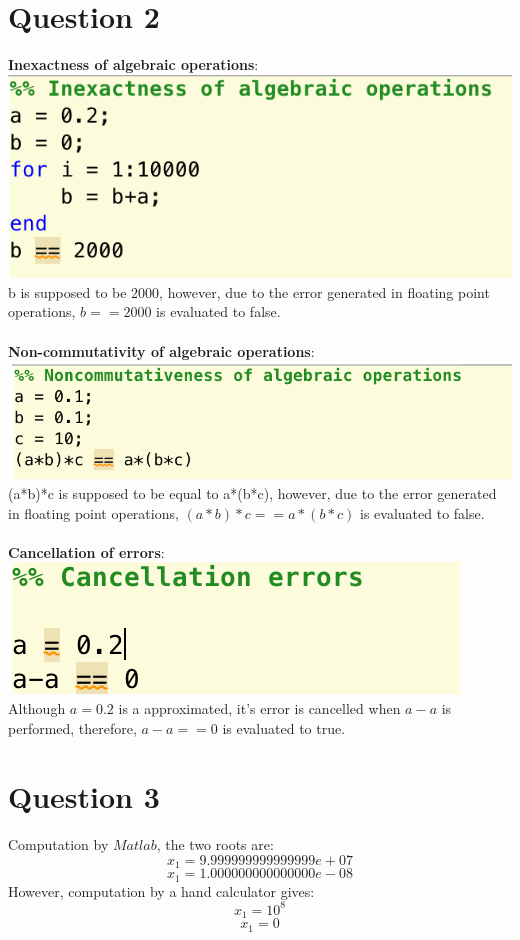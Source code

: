 \documentclass[11pt]{article} %
\begin{document}
\section{Question 2}
\textbf{Inexactness of algebraic operations}:\\
\includegraphics{q21}\\
b is supposed to be 2000, however, due to the error generated in floating point operations, $b==2000$ is evaluated to false. \\\\
\textbf{Non-commutativity of algebraic operations}:\\
\includegraphics{q22}\\
(a*b)*c is supposed to be equal to a*(b*c), however, due to the error generated in floating point operations, $(a*b)*c == a*(b*c)$ is evaluated to false. \\\\
\textbf{Cancellation of errors}:\\
\includegraphics{q23}\\
Although $a = 0.2$ is a approximated, it's error is cancelled when $a-a$ is performed, therefore, $a-a == 0$ is evaluated to true. 
\section{Question 3}
Computation by $Matlab$, the two roots are:
\begin{equation}x_{1} = 9.999999999999999e+07\end{equation}
\begin{equation}x_{1} = 1.000000000000000e-08\end{equation}
However, computation by a hand calculator gives:
\begin{equation}x_{1} = 10^{8}\end{equation}
\begin{equation}x_{1} = 0\end{equation}
\end{document}

